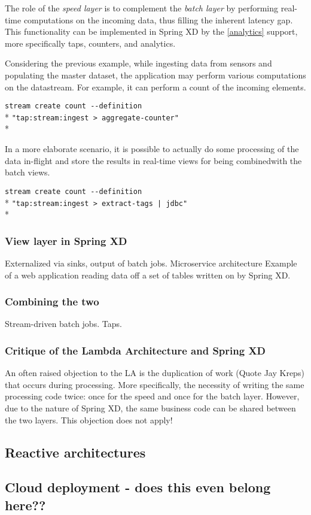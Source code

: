 The role of the \emph{speed layer} is to complement the \emph{batch layer} 
by performing real-time computations on the incoming data, thus filling the 
inherent latency gap. This functionality can be implemented in Spring XD by the 
\ref{analytics} support, more specifically taps, counters, and analytics.

Considering the previous example, while ingesting data from sensors and 
populating the master dataset, the application may perform various computations 
on the datastream. For example, it can perform a count of the incoming elements. 

\verb;stream create count --definition  ;\\*
\verb;"tap:stream:ingest > aggregate-counter";\\*

In a more elaborate scenario, it is possible to actually do 
some processing of the data in-flight and store the results in real-time views
for being combinedwith the batch views.

\verb;stream create count --definition  ;\\*
\verb;"tap:stream:ingest > extract-tags | jdbc";\\*

\subsubsection {View layer in Spring XD}

Externalized via sinks, output of batch jobs. Microservice architecture
Example of a web application reading data off a set of tables
written on by Spring XD. 

\subsubsection {Combining the two}

Stream-driven batch jobs. Taps. 


\subsubsection {Critique of the Lambda Architecture and Spring XD}

An often raised objection to the LA is the duplication of work
(Quote Jay Kreps) that occurs during processing. More specifically,
the necessity of writing the same processing code twice: once for the
speed and once for the batch layer. However, due to the nature of
Spring XD, the same business code can be shared between the two 
layers. This objection does not apply!

\subsection {Reactive architectures}

\subsection {Cloud deployment - does this even belong here??}
